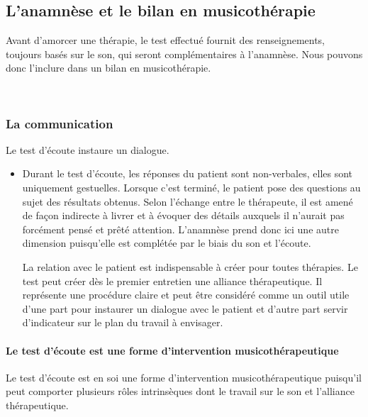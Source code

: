 \subsection{L'anamnèse et le bilan en musicothérapie}

  Avant d'amorcer une thérapie, le test effectué fournit des renseignements, toujours basés sur le son, qui seront complémentaires à l'anamnèse. Nous pouvons donc l'inclure dans un  bilan en musicothérapie.

  \
\subsubsection{La communication}

Le test d'écoute instaure un dialogue.
  
\begin{itemize}
  \item Durant le test d'écoute, les réponses du patient sont
    non-verbales, elles sont 
 uniquement gestuelles. Lorsque c'est terminé,
 le patient pose des questions au sujet des résultats obtenus. Selon
 l'échange entre le thérapeute, il est amené de façon
 indirecte à livrer et à évoquer des détails auxquels il
 n'aurait pas forcément pensé et prêté attention. L'anamnèse prend
 donc ici une autre  dimension puisqu'elle est complétée par le biais du son et l'écoute.

	 La relation avec le patient est indispensable à créer pour toutes thérapies. Le test peut créer dès le premier entretien une alliance thérapeutique.
	Il représente une procédure claire et  peut être
        considéré comme un outil utile d'une part pour instaurer un dialogue avec
        le patient et d'autre part servir d'indicateur sur le plan du travail à
        envisager.
  \end{itemize}      
\paragraph{Le test d'écoute est une forme d'intervention musicothérapeutique}
Le test d'écoute est en soi une forme d'intervention
 musicothérapeutique puisqu'il peut
 comporter plusieurs rôles intrinsèques dont le travail sur le son et
 l'alliance thérapeutique.
 


